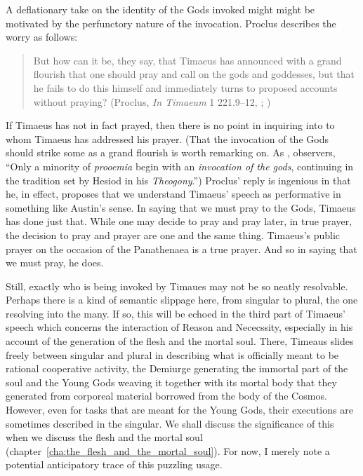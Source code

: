 A deflationary take on the identity of the Gods invoked might might be motivated by the perfunctory nature of the invocation. Proclus describes the worry as follows:
\begin{quote}
	But how can it be, they say, that Timaeus has announced with a grand flourish that one should pray and call on the gods and goddesses, but that he fails to do this himself and immediately turns to proposed accounts without praying? (Proclus, \emph{In Timaeum} 1 221.9--12, \citealt{Diehl:1903re}; \citealt[58]{Runia:2008aa})
\end{quote}
If Timaeus has not in fact prayed, then there is no point in inquiring into to whom Timaeus has addressed his prayer. (That the invocation of the Gods should strike some as a grand flourish is worth remarking on. As \citealt[104]{Runia:1997vz}, observers, ``Only a minority of \emph{prooemia} begin with an \emph{invocation of the gods}, continuing in the tradition set by Hesiod in his \emph{Theogony}.'') Proclus' reply is ingenious in that he, in effect, proposes that we understand Timaeus' speech as performative in something like Austin's \citeyearpar{Austin:1975nx} sense. In saying that we must pray to the Gods, Timaeus has done just that. While one may decide to pray and pray later, in true prayer, the decision to pray and prayer are one and the same thing. Timaeus's public prayer on the occasion of the Panathenaea is a true prayer. And so in saying that we must pray, he does.

Still, exactly who is being invoked by Timaues may not be so neatly resolvable. Perhaps there is a kind of semantic slippage here, from singular to plural, the one resolving into the many. If so, this will be echoed in the third part of Timaeus' speech which concerns the interaction of Reason and Nececssity, especially in his account of the generation of the flesh and the mortal soul. There, Timeaus slides freely between singular and plural in describing what is officially meant to be rational cooperative activity, the Demiurge generating the immortal part of the soul and the Young Gods weaving it together with its mortal body that they generated from corporeal material borrowed from the body of the Cosmos. However, even for tasks that are meant for the Young Gods, their executions are sometimes described in the singular. We shall discuss the significance of this when we discuss the flesh and the mortal soul (chapter~\ref{cha:the_flesh_and_the_mortal_soul}). For now, I merely note a potential anticipatory trace of this puzzling usage. 

